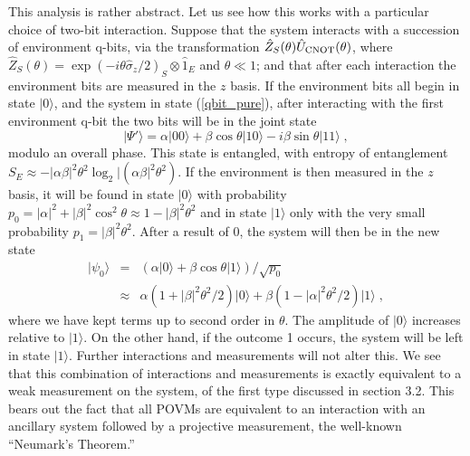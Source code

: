 \documentclass[12pt]{article}
\def\ket#1{{| #1 \rangle}}
\def\sz{{\hat\sigma_z}}
\def\id{{\hat 1}}
\def\U{{\hat U}}
\def\Z{{\hat Z}}
\begin{document}
This analysis is rather abstract.  Let us see how this works with
a particular choice of two-bit interaction.  Suppose that the
system interacts with a succession of environment q-bits,
via the transformation $\Z_S(\theta)\U_{\rm CNOT}(\theta)$,
where $\Z_S(\theta) = \exp(-i\theta\sz/2)_S\otimes\id_E$
and $\theta \ll 1$; and that after each interaction the environment bits
are measured in the $z$ basis.  If the environment bits all begin in state
$\ket0$, and the system in state (\ref{qbit_pure}), after interacting with
the first environment q-bit the two bits will be in the joint state
\begin{equation}
\ket{\Psi'} = \alpha\ket{00} + \beta\cos\theta\ket{10}
  - i \beta\sin\theta\ket{11} \;,
\label{weakCNOT}
\end{equation}
modulo an overall phase.
This state is entangled, with entropy of entanglement
$S_E \approx - |\alpha\beta|^2\theta^2 \log_2|(\alpha\beta|^2\theta^2)$.
If the environment is then measured in the $z$ basis, it will be found in
state $\ket0$ with probability
$p_0 = |\alpha|^2 + |\beta|^2\cos^2\theta \approx 1 - |\beta|^2\theta^2$
and in state $\ket1$ only with the very small probability
$p_1 = |\beta|^2\theta^2$.  After a result of 0, the system will then be
in the new state
\begin{eqnarray}
\ket{\psi_0} &=& (\alpha\ket0
  + \beta\cos\theta\ket1)/\sqrt{p_0} \nonumber\\
&\approx& \alpha (1+|\beta|^2\theta^2/2) \ket0
  + \beta (1-|\alpha|^2\theta^2/2) \ket1 \;,
\end{eqnarray}
where we have kept terms up to second order in $\theta$.
The amplitude of $\ket0$ increases relative to $\ket1$.  On the other hand,
if the outcome 1 occurs, the system will be left in state $\ket1$.
Further interactions and measurements will not alter this.  We see that
this combination of interactions and measurements is exactly equivalent
to a weak measurement on the system, of the first type discussed in
section 3.2.
This bears out the fact that all POVMs are equivalent
to an interaction with an ancillary system followed by a projective
measurement, the well-known ``Neumark's Theorem.''
\end{document}
